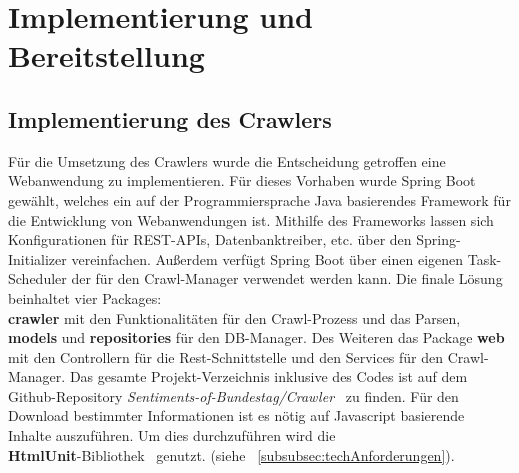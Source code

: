 \section{Implementierung und Bereitstellung}\label{sec:02_04_implementierung_bereitstellung}

\subsection{Implementierung des Crawlers}
Für die Umsetzung des Crawlers wurde die Entscheidung getroffen eine Webanwendung zu implementieren. Für dieses Vorhaben wurde Spring Boot~\cite{SpringBoot242} gewählt, welches ein auf der Programmiersprache Java basierendes Framework für die Entwicklung von Webanwendungen ist. Mithilfe des Frameworks lassen sich Konfigurationen für REST-APIs, Datenbanktreiber, etc. über den Spring-Initializer vereinfachen. Außerdem verfügt Spring Boot über einen eigenen Task-Scheduler der für den Crawl-Manager verwendet werden kann. Die finale Lösung beinhaltet vier Packages: \\\textbf{crawler} mit den Funktionalitäten für den Crawl-Prozess und das Parsen, \textbf{models} und \textbf{repositories} für den DB-Manager. Des Weiteren das Package \textbf{web} mit den Controllern für die Rest-Schnittstelle und den Services für den Crawl-Manager. Das gesamte Projekt-Verzeichnis inklusive des Codes ist auf dem Github-Repository \textit{Sentiments-of-Bundestag/Crawler}~\cite{Crawler2021} zu finden. Für den Download bestimmter Informationen ist es nötig auf Javascript basierende Inhalte auszuführen. Um dies durchzuführen wird die \\\textbf{HtmlUnit}-Bibliothek~\cite{HtmlUnit2021} genutzt. (siehe ~\ref{subsubsec:techAnforderungen}).

